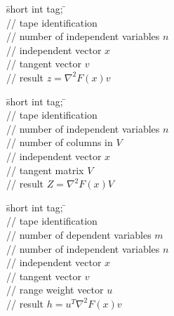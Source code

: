 \documentclass[11pt,twoside]{article}
\begin{document}
\begin{tabbing}
\hspace{0.5in}\={\sf short int tag;} \hspace{1.1in}\= \kill    %
\\
         \> // tape identification \\
                 \> // number of independent variables $n$\\
           \> // independent vector $x$\\
           \> // tangent vector $v$\\
           \> // result $z = \nabla^2F(x) v$ 
\end{tabbing}
%
\begin{tabbing}
\hspace{0.5in}\={\sf short int tag;} \hspace{1.1in}\= \kill    %
\\
         \> // tape identification \\
                 \> // number of independent variables $n$\\
                 \> // number of columns in $V$\\
           \> // independent vector $x$\\
        \> // tangent matrix $V$\\
        \> // result $Z = \nabla^2F(x) V$ 
\end{tabbing}
%
\begin{tabbing}
\hspace{0.5in}\={\sf short int tag;} \hspace{1.1in}\= \kill    %
\\
         \> // tape identification \\
                 \> // number of dependent variables $m$\\
                 \> // number of independent variables $n$\\
           \> // independent vector $x$\\
           \> // tangent vector $v$\\
           \> // range weight vector $u$ \\
           \> // result $h = u^T\nabla^2F(x) v $
\end{tabbing}
\end{document}
